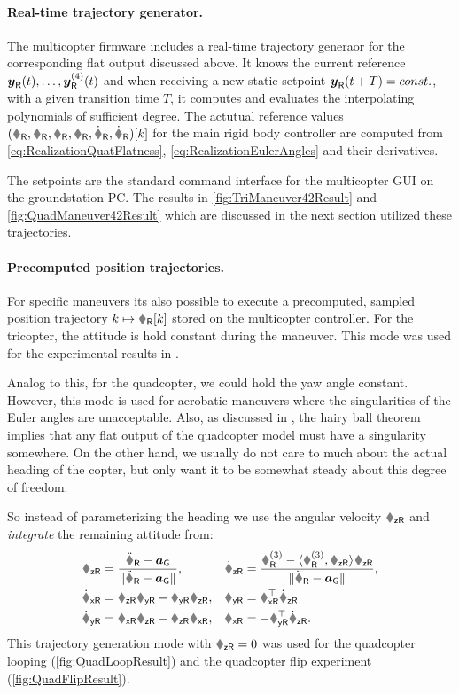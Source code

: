 \paragraph{Real-time trajectory generator.}
The multicopter firmware includes a real-time trajectory generaor for the corresponding flat output discussed above.
It knows the current reference $\boldsymbol{y}_{\mathsf{R}}(t), \ldots, \boldsymbol{y}^{(4)}_{\mathsf{R}}(t)$ and when receiving a new static setpoint $\boldsymbol{y}_{\mathsf{R}}(t+T) = const.$, with a given transition time $T$, it computes and evaluates the interpolating polynomials of sufficient degree.
The actutual reference values $(\rR, \RR, \vR, \wR, \vRd, \wRd)[k]$ for the main rigid body controller are computed from \eqref{eq:RealizationQuatFlatness}, \eqref{eq:RealizationEulerAngles} and their derivatives.

The setpoints are the standard command interface for the multicopter GUI on the groundstation PC.
The results in \autoref{fig:TriManeuver42Result} and \autoref{fig:QuadManeuver42Result} which are discussed in the next section utilized these trajectories.

\paragraph{Precomputed position trajectories.}
For specific maneuvers its also possible to execute a precomputed, sampled position trajectory $k \mapsto \rR[k]$ stored on the multicopter controller.
For the tricopter, the attitude is hold constant during the maneuver.
This mode was used for the experimental results in \cite{Irscheid:HeavyRopesTricopter}.

Analog to this, for the quadcopter, we could hold the yaw angle constant.
However, this mode is used for aerobatic maneuvers where the singularities of the Euler angles are unacceptable.
Also, as discussed in \cite{Konz:QuadrotorMovingFrame}, the hairy ball theorem \cite{Brouwer:HairyBallTheorem} implies that any flat output of the quadcopter model must have a singularity somewhere.
On the other hand, we usually do not care to much about the actual heading of the copter, but only want it to be somewhat steady about this degree of freedom.

So instead of parameterizing the heading we use the angular velocity $\wRz$ and \textit{integrate} the remaining attitude from:
\begin{subequations}
\begin{align}
 \RRz &= \frac{\rRdd - \gravityAcc}{\norm{\rRdd - \gravityAcc}},&
 \RRzd &= \frac{\rRddd - \sProd{\rRddd}{\RRz} \RRz}{\norm{\rRdd - \gravityAcc}},
\\
 \RRxd &= \wRz \RRy - \wRy \RRz,&
 \wRy &= \RRx^\top \RRzd
\\
 \RRyd &= \wRx \RRz - \wRz \RRx,&
 \wRx &= -\RRy^\top \RRzd.
\end{align}
\end{subequations}
This trajectory generation mode with $\wRz=0$ was used for the quadcopter looping (\autoref{fig:QuadLoopResult}) and the quadcopter flip experiment (\autoref{fig:QuadFlipResult}).


